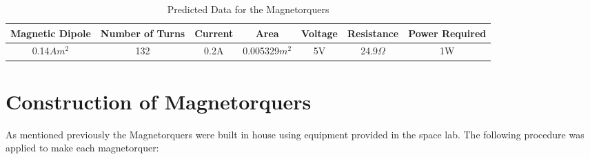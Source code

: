 \begin{table}[H]
\begin{center}
\caption{Predicted Data for the Magnetorquers}
\begin{tabular}{|c|c|c|c|c|c|c|}
\hline
Magnetic Dipole & Number of Turns & Current & Area & Voltage & Resistance & Power Required \\
\hline
0.14$Am^2$ & 132 & 0.2A & 0.005329$m^2$ & 5V & 24.9$\Omega$ & 1W \\
\hline
\end{tabular}
\end{center}
\vspace{-6mm}
\end{table}

\section{Construction of Magnetorquers}
As mentioned previously the Magnetorquers were built in house using equipment provided in the space lab.  The following procedure was applied to make each magnetorquer:
